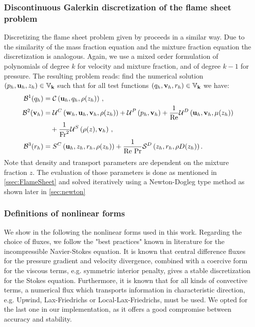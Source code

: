 \subsubsection{Discontinuous Galerkin discretization of the flame sheet problem}
Discretizing the flame sheet problem given by  proceeds in a similar way. Due to the similarity of the mass fraction equation and the mixture fraction equation the discretization is analogous. Again, we use a mixed order formulation of polynomials of degree $k$ for velocity and mixture fraction, and of degree $k-1$ for pressure. The resulting problem reads: find the numerical solution $(p_h,\textbf{u}_h,z_h)\in \mathbb{V}_{\textbf{k}}$ such that for all test functions $(q_h,\textbf{v}_h,r_h)\in \mathbb{V}_{\textbf{k}}$ we have: 
\begin{subequations}
	\begin{align} 
		\mathcal{B}^1(q_h)
		&= 	\mathcal{C}\left(\textbf{u}_h,q_h, \rho(z_h)\right) \,, \label{DiscretizedConti2} \\
		\mathcal{B}^2(\textbf{v}_h)
		&= 	\mathcal{U}^C\left(\textbf{w}_h,\textbf{u}_h,\textbf{v}_h, \rho(z_h)\right)+ 	\mathcal{U}^P\left(p_h,\textbf{v}_h\right) +\frac{1}{\text{Re}}\mathcal{U}^D\left(\textbf{u}_h,\textbf{v}_h,\mu(z_h)\right)\notag\\
		&\quad  + \frac{1}{\text{Fr}^2}\mathcal{U}^S\left(\rho(z), \textbf{v}_h\right)\,, \label{DiscretizedMomentum2} \\
		\mathcal{B}^3(r_h)
		&= {S}^C\left(\textbf{u}_h,z_h,r_h, \rho(z_h)\right) + \frac{1}{\text{Re}~\text{Pr}}\mathcal{S}^D\left(z_h,r_h,\rho D(z_h)\right). \label{DiscretizedEnergy2}
	\end{align}\label{eqs:variatFS}
\end{subequations}
Note that density and transport parameters are dependent on the mixture fraction $z$. The evaluation of those parameters is done as mentioned in  \cref{ssec:FlameSheet} and solved iteratively using a Newton-Dogleg type method as shown later in \cref{sec:newton}
\subsubsection{Definitions of nonlinear forms}
We show in the following the nonlinear forms used in this work. Regarding the choice of fluxes, we follow the "best practices" known in literature for the incompressible Navier-Stokes equation.
It is known \cite{pietroMathematicalAspectsDiscontinuous2012,giraultDiscontinuousGalerkinMethod2004} that central difference fluxes for the pressure gradient and velocity divergence, combined with a coercive form for the viscous terms, e.g. symmetric interior penalty, gives a stable discretization for the Stokes equation. Furthermore, it is known that for all kinds of convective terms, a numerical flux which transports information in characteristic direction, e.g. Upwind, Lax-Friedrichs or Local-Lax-Friedrichs, must be used. We opted for the last one in our implementation, as it offers a good compromise between accuracy and stability.
